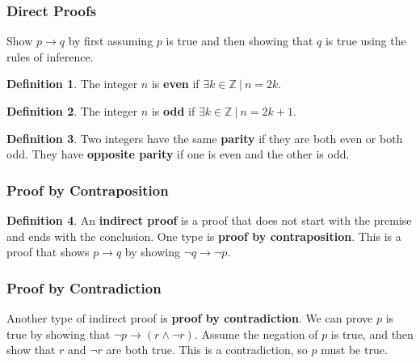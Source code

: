 \documentclass[article, 11pt]{article}
\theoremstyle{definition}
\newtheorem{definition}{Definition}[section]
\newcommand{\ints}{\mathbb{Z}}
\begin{document}
    \subsubsection{Direct Proofs}
    Show $p \to q$ by first assuming $p$ is true and then showing that $q$ is true using the rules of inference.
    
    \begin{definition}
        The integer $n$ is \textbf{even} if $\exists k \in \ints \ | \ n = 2k$.
    \end{definition}
    \begin{definition}
        The integer $n$ is \textbf{odd} if $\exists k \in \ints \ | \ n = 2k + 1$.   
    \end{definition}
    \begin{definition}
        Two integers have the same \textbf{parity} if they are both even or both odd. They have \textbf{opposite parity} if one is even and the other is odd.     
    \end{definition}
    \subsubsection{Proof by Contraposition}
    \begin{definition}
        An \textbf{indirect proof} is a proof that does not start with the premise and ends with the conclusion. One type is \textbf{proof by contraposition}. This is a proof that shows $p \to q$ by showing $\neg q \to \neg p$.   
    \end{definition}
    \subsubsection{Proof by Contradiction}
    Another type of indirect proof is \textbf{proof by contradiction}. 
    We can prove $p$ is true by showing that $\neg p \to (r \land \neg r)$. Assume the negation of $p$ is true, and then show that $r$ and $\neg r$ are both true. This is a contradiction, so $p$ must be true.
    \\
\end{document}
